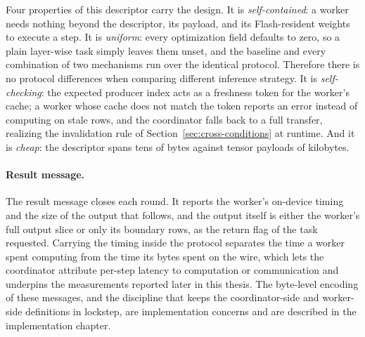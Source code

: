 Four properties of this descriptor carry the design.
It is \emph{self-contained}: a worker needs nothing beyond the descriptor, its payload, and its Flash-resident weights to execute a step.
It is \emph{uniform}: every optimization field defaults to zero, so a plain layer-wise task simply leaves them unset, and the baseline and every combination of two mechanisms run over the identical protocol. Therefore there is no protocol differences when comparing different inference strategy.
It is \emph{self-checking}: the expected producer index acts as a freshness token for the worker's cache; a worker whose cache does not match the token reports an error instead of computing on stale rows, and the coordinator falls back to a full transfer, realizing the invalidation rule of Section~\ref{sec:cross-conditions} at runtime.
And it is \emph{cheap}: the descriptor spans tens of bytes against tensor payloads of kilobytes.


\paragraph{Result message.}
The result message closes each round.
It reports the worker's on-device timing and the size of the output that follows, and the output itself is either the worker's full output slice or only its boundary rows, as the return flag of the task requested.
Carrying the timing inside the protocol separates the time a worker spent computing from the time its bytes spent on the wire, which lets the coordinator attribute per-step latency to computation or communication and underpins the measurements reported later in this thesis.
The byte-level encoding of these messages, and the discipline that keeps the coordinator-side and worker-side definitions in lockstep, are implementation concerns and are described in the implementation chapter.






